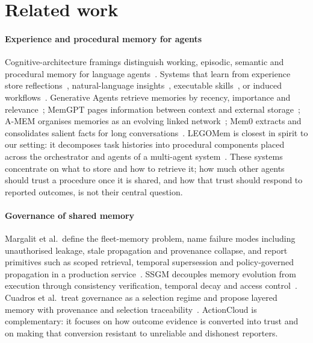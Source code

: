 \documentclass[5p,times,twocolumn]{elsarticle}
\newcommand{\sysname}{ActionCloud}
\begin{document}
\section{Related work}
\label{sec:related}

\paragraph{Experience and procedural memory for agents}
Cognitive-architecture framings distinguish working, episodic, semantic and procedural memory for language agents~\cite{sumers2024coala}. Systems that learn from experience store reflections~\cite{shinn2023reflexion}, natural-language insights~\cite{zhao2024expel}, executable skills~\cite{wang2024voyager}, or induced workflows~\cite{wang2024awm}. Generative Agents retrieve memories by recency, importance and relevance~\cite{park2023generative}; MemGPT pages information between context and external storage~\cite{packer2023memgpt}; A-MEM organises memories as an evolving linked network~\cite{xu2025amem}; Mem0 extracts and consolidates salient facts for long conversations~\cite{chhikara2025mem0}. LEGOMem is closest in spirit to our setting: it decomposes task histories into procedural components placed across the orchestrator and agents of a multi-agent system~\cite{han2025legomem}. These systems concentrate on what to store and how to retrieve it; how much other agents should trust a procedure once it is shared, and how that trust should respond to reported outcomes, is not their central question.

\paragraph{Governance of shared memory}
Margalit et al.\ define the fleet-memory problem, name failure modes including unauthorised leakage, stale propagation and provenance collapse, and report primitives such as scoped retrieval, temporal supersession and policy-governed propagation in a production service~\cite{margalit2026governed}. SSGM decouples memory evolution from execution through consistency verification, temporal decay and access control~\cite{lam2026ssgm}. Cuadros et al.\ treat governance as a selection regime and propose layered memory with provenance and selection traceability~\cite{cuadros2026selection}. \sysname{} is complementary: it focuses on how outcome evidence is converted into trust and on making that conversion resistant to unreliable and dishonest reporters.
\end{document}
